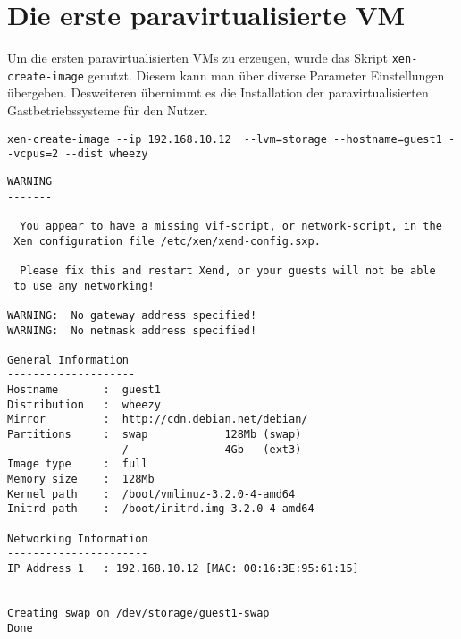 \section{Die erste paravirtualisierte VM}
Um die ersten paravirtualisierten VMs zu erzeugen, wurde das Skript \verb#xen-create-image# genutzt. Diesem kann man über diverse Parameter Einstellungen übergeben. Desweiteren übernimmt es die Installation der paravirtualisierten Gastbetriebssysteme für den Nutzer.
\begin{verbatim}
xen-create-image --ip 192.168.10.12  --lvm=storage --hostname=guest1 --vcpus=2 --dist wheezy
\end{verbatim}
\setupVerbatimOut
\begin{verbatim}                                                  
WARNING                                           
-------                                           
                                                  
  You appear to have a missing vif-script, or network-script, in the
 Xen configuration file /etc/xen/xend-config.sxp. 
                                                  
  Please fix this and restart Xend, or your guests will not be able
 to use any networking!                           
                                                  
WARNING:  No gateway address specified!           
WARNING:  No netmask address specified!           
                                                  
General Information                               
--------------------                              
Hostname       :  guest1                          
Distribution   :  wheezy                          
Mirror         :  http://cdn.debian.net/debian/   
Partitions     :  swap            128Mb (swap)    
                  /               4Gb   (ext3)    
Image type     :  full                            
Memory size    :  128Mb                           
Kernel path    :  /boot/vmlinuz-3.2.0-4-amd64     
Initrd path    :  /boot/initrd.img-3.2.0-4-amd64  
                                                  
Networking Information                            
----------------------                            
IP Address 1   : 192.168.10.12 [MAC: 00:16:3E:95:61:15]
                                                  
                                                  
Creating swap on /dev/storage/guest1-swap         
Done                                              
                                                  

\end{verbatim}
